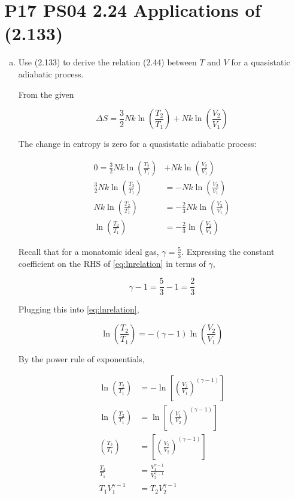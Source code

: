 \documentclass[9pt,a4paper,twocolumn]{article}
\begin{document}
\section{P17 PS04 2.24 Applications of (2.133)}

\begin{enumerate}[(a)]

\item Use (2.133) to derive the relation (2.44) between $T$ and $V$ for a quasistatic adiabatic process.

From the given

\begin{equation}\label{eq:given}
	\Delta S = \frac{3}{2} Nk \ln{\left( \frac{T_2}{T_1} \right)} + Nk \ln{\left(  \frac{V_2}{V_1} \right)}
\end{equation}

The change in entropy is zero for a quasistatic adiabatic process:

\begin{align}
	0 = \frac{3}{2} Nk \ln{\left( \frac{T_2}{T_1} \right)} &+ Nk \ln{\left(  \frac{V_2}{V_1} \right)} \\
	\frac{3}{2} Nk \ln{\left( \frac{T_2}{T_1} \right)} &= -Nk \ln{\left(  \frac{V_2}{V_1} \right)} \\
	Nk \ln{\left( \frac{T_2}{T_1} \right)} &= -\frac{2}{3} Nk \ln{\left(  \frac{V_2}{V_1} \right)} \\
	\ln{\left( \frac{T_2}{T_1} \right)} &= -\frac{2}{3} \ln{\left(  \frac{V_2}{V_1} \right)} \label{eq:lnrelation}
\end{align}

Recall that for a monatomic ideal gas, $\gamma = \frac{5}{3}$. Expressing the constant coefficient on the RHS of \eqref{eq:lnrelation} in terms of $\gamma$,

\begin{equation}\label{eq:gammarelation}
	\gamma - 1 = \frac{5}{3} - 1 = \frac{2}{3}
\end{equation}

Plugging this into \eqref{eq:lnrelation},

\begin{equation}
	\ln{\left( \frac{T_2}{T_1} \right)} = -\left( \gamma - 1 \right) \ln{\left(  \frac{V_2}{V_1} \right)}
\end{equation}

By the power rule of exponentials,

\begin{align}
	\ln{\left( \frac{T_2}{T_1} \right)} &= -\ln{ \left[ \left( \frac{V_2}{V_1} \right)^{\left( \gamma - 1 \right) } \right] } \\
	\ln{\left( \frac{T_2}{T_1} \right)} &= \ln{ \left[ \left( \frac{V_1}{V_2} \right)^{\left( \gamma - 1 \right) } \right] } \\
	\left( \frac{T_2}{T_1} \right) &= \left[ \left( \frac{V_1}{V_2} \right)^{\left( \gamma - 1 \right) } \right] \\
	\frac{T_2}{T_1} &= \frac{V_1^{\gamma - 1}}{V_2^{\gamma - 1}} \\
	T_1 V_1^{\gamma - 1} &= T_2 V_2^{\gamma - 1}
\end{align}


\end{enumerate}
\end{document}
